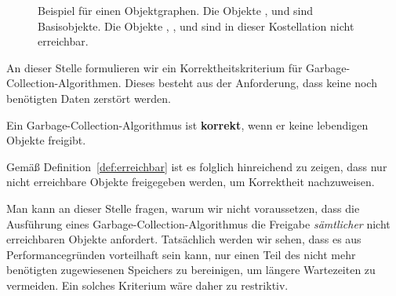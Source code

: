 \begin{figure}[h]
	\centering
	
	\caption[Beispiel für einen Objektgraphen]{Beispiel für einen Objektgraphen. Die Objekte ,  und  sind Basisobjekte. Die Objekte , ,  und  sind in dieser Kostellation nicht erreichbar.}
\end{figure}

An dieser Stelle formulieren wir ein Korrektheitskriterium für Garbage-Collection-Algorithmen.
Dieses besteht aus der Anforderung, dass keine noch benötigten Daten zerstört werden.

\begin{mybox}
\begin{defn}
	Ein Garbage-Collection-Algorithmus ist \textbf{korrekt}, wenn er keine lebendigen Objekte freigibt.
\end{defn}
\end{mybox}

Gemäß Definition~\ref{def:erreichbar} ist es folglich hinreichend zu zeigen, dass nur nicht erreichbare Objekte freigegeben werden, um Korrektheit nachzuweisen.

Man kann an dieser Stelle fragen, warum wir nicht voraussetzen, dass die Ausführung eines Garbage-Collection-Algorithmus die Freigabe \textit{sämtlicher} nicht erreichbaren Objekte anfordert.
Tatsächlich werden wir sehen, dass es aus Performancegründen vorteilhaft sein kann, nur einen Teil des nicht mehr benötigten zugewiesenen Speichers zu bereinigen, um längere Wartezeiten zu vermeiden.
Ein solches Kriterium wäre daher zu restriktiv.